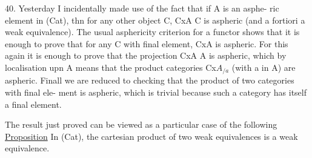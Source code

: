 40. Yesterday I incidentally made use of the fact that if A is an asphe-%
ric element in (Cat), thn for any other object C, CxA \hand{$\longrightarrow$} C is aspheric
(and a fortiori a weak equivalence). The usual asphericity criterion for a
functor shows that it is enough to prove that for any C with final element,
\margin{$\downarrow$}CxA is aspheric.  For this again it is enough to prove that the
projection CxA \hand{$\longrightarrow$} A is aspheric, which by localisation upn A means that
the product categories  Cx\hand{(}$A_{/a}$\hand{)} (with a in A) are aspheric. Finall we
are reduced to checking that the product of two categories with final ele-%
ment is aspheric, which is trivial because such a category has itself a
final element.

The result just proved can be viewed as a particular case of the
following
\uline{Proposition} In (Cat), the cartesian product of two weak equivalences is
a weak equivalence.
